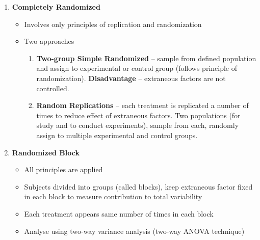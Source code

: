 \documentclass{article}
\begin{document}
\begin{enumerate}
    \item \textbf{Completely Randomized}
    \begin{itemize}
        \item Involves only principles of replication and randomization
        \item Two approaches
        \begin{enumerate}
            \item \textbf{Two-group Simple Randomized} -- sample from defined population and assign to experimental or control group (follows principle of randomization). \textbf{Disadvantage} -- extraneous factors are not controlled.
            \item \textbf{Random Replications} -- each treatment is replicated a number of times to reduce effect of extraneous factors. Two populations (for study and to conduct experiments), sample from each, randomly assign to multiple experimental and control groups.
        \end{enumerate}
    \end{itemize}
    
    \item \textbf{Randomized Block}
    \begin{itemize}
        \item All principles are applied
        \item Subjects divided into groups (called blocks), keep extraneous factor fixed in each block to measure contribution to total variability
        \item Each treatment appears same number of times in each block
        \item Analyse using two-way variance analysis (two-way ANOVA technique)
    \end{itemize}
    

\end{enumerate}
\end{document}
